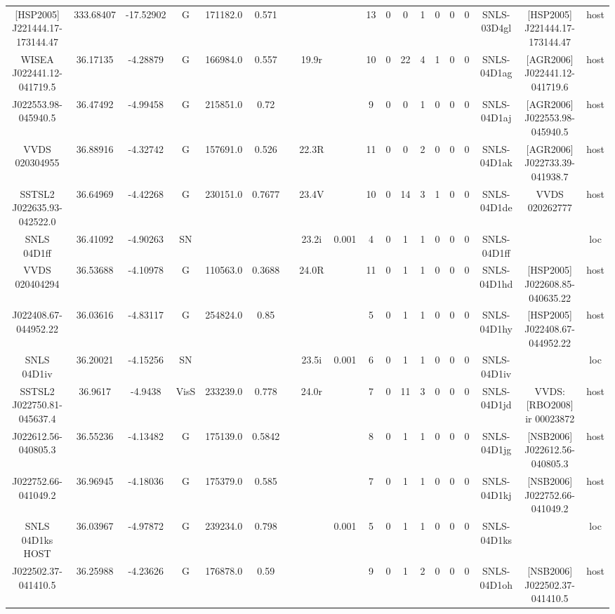 \begin{table}
\begin{tabular}{ccccccccccccccccccc}
[HSP2005] J221444.17-173144.47 & 333.68407 & -17.52902 & G & 171182.0 & 0.571 &  &  &  & 13 & 0 & 0 & 1 & 0 & 0 & 0 & SNLS-03D4gl & [HSP2005] J221444.17-173144.47 & host \\
WISEA J022441.12-041719.5 & 36.17135 & -4.28879 & G & 166984.0 & 0.557 &  & 19.9r &  & 10 & 0 & 22 & 4 & 1 & 0 & 0 & SNLS-04D1ag & [AGR2006] J022441.12-041719.6 & host \\
[AGR2006] J022553.98-045940.5 & 36.47492 & -4.99458 & G & 215851.0 & 0.72 &  &  &  & 9 & 0 & 0 & 1 & 0 & 0 & 0 & SNLS-04D1aj & [AGR2006] J022553.98-045940.5 & host \\
VVDS 020304955 & 36.88916 & -4.32742 & G & 157691.0 & 0.526 &  & 22.3R &  & 11 & 0 & 0 & 2 & 0 & 0 & 0 & SNLS-04D1ak & [AGR2006] J022733.39-041938.7 & host \\
SSTSL2 J022635.93-042522.0 & 36.64969 & -4.42268 & G & 230151.0 & 0.7677 &  & 23.4V &  & 10 & 0 & 14 & 3 & 1 & 0 & 0 & SNLS-04D1de & VVDS 020262777 & host \\
SNLS 04D1ff & 36.41092 & -4.90263 & SN &  &  &  & 23.2i & 0.001 & 4 & 0 & 1 & 1 & 0 & 0 & 0 & SNLS-04D1ff &  & loc \\
VVDS 020404294 & 36.53688 & -4.10978 & G & 110563.0 & 0.3688 &  & 24.0R &  & 11 & 0 & 1 & 1 & 0 & 0 & 0 & SNLS-04D1hd & [HSP2005] J022608.85-040635.22 & host \\
[HSP2005] J022408.67-044952.22 & 36.03616 & -4.83117 & G & 254824.0 & 0.85 &  &  &  & 5 & 0 & 1 & 1 & 0 & 0 & 0 & SNLS-04D1hy & [HSP2005] J022408.67-044952.22 & host \\
SNLS 04D1iv & 36.20021 & -4.15256 & SN &  &  &  & 23.5i & 0.001 & 6 & 0 & 1 & 1 & 0 & 0 & 0 & SNLS-04D1iv &  & loc \\
SSTSL2 J022750.81-045637.4 & 36.9617 & -4.9438 & VisS & 233239.0 & 0.778 &  & 24.0r &  & 7 & 0 & 11 & 3 & 0 & 0 & 0 & SNLS-04D1jd & VVDS:[RBO2008] ir 00023872 & host \\
[NSB2006] J022612.56-040805.3 & 36.55236 & -4.13482 & G & 175139.0 & 0.5842 &  &  &  & 8 & 0 & 1 & 1 & 0 & 0 & 0 & SNLS-04D1jg & [NSB2006] J022612.56-040805.3 & host \\
[NSB2006] J022752.66-041049.2 & 36.96945 & -4.18036 & G & 175379.0 & 0.585 &  &  &  & 7 & 0 & 1 & 1 & 0 & 0 & 0 & SNLS-04D1kj & [NSB2006] J022752.66-041049.2 & host \\
SNLS 04D1ks HOST & 36.03967 & -4.97872 & G & 239234.0 & 0.798 &  &  & 0.001 & 5 & 0 & 1 & 1 & 0 & 0 & 0 & SNLS-04D1ks &  & loc \\
[NSB2006] J022502.37-041410.5 & 36.25988 & -4.23626 & G & 176878.0 & 0.59 &  &  &  & 9 & 0 & 1 & 2 & 0 & 0 & 0 & SNLS-04D1oh & [NSB2006] J022502.37-041410.5 & host \\

\end{tabular}
\end{table}
